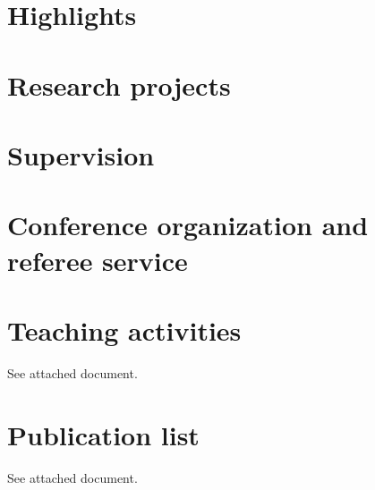 




\newpage
\section{Highlights}

%

\newpage
\section{Research projects}
{
  
}

\newpage  
\section{Supervision}
{
  \let\section\paragraph
  
}
 
\newpage  
\section{Conference organization and referee service}
{
  \let\section\paragraph
  
}

\newpage
\section{Teaching activities}

See attached document.

\section{Publication list}

See attached document.



